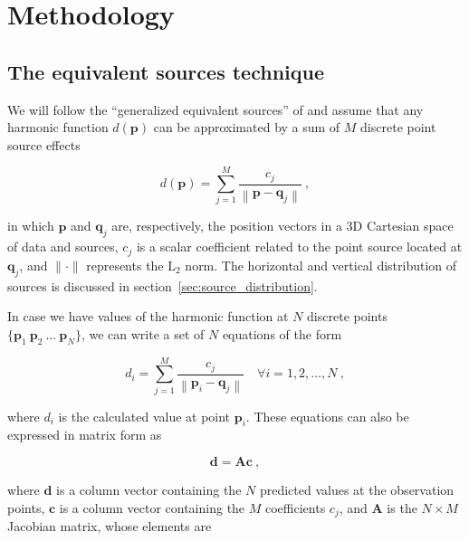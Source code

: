 
\section{Methodology}

\subsection{The equivalent sources technique}

We will follow the ``generalized equivalent sources'' of \citet{cordell1992}
and assume that any harmonic function $d(\mathbf{p})$ can be approximated by a
sum of $M$ discrete point source effects

\begin{equation}
    d(\mathbf{p})
    =
    \sum\limits_{j=1}^{M} \frac{c_j}{\left\lVert \mathbf{p} - \mathbf{q}_j
    \right\rVert} \ ,
    \label{eq:eql-forward}
\end{equation}

\noindent in which
$\mathbf{p}$ and $\mathbf{q}_j$ are, respectively, the position vectors in a 3D
Cartesian space of data and sources,
$c_j$ is a scalar coefficient related to the point source located at
$\mathbf{q}_j$,
and $\lVert \cdot \rVert$ represents the $\text{L}_2$ norm.
The horizontal and vertical distribution of sources is discussed in
section~\ref{sec:source_distribution}.

In case we have values of the harmonic function at $N$ discrete points
$\{\mathbf{p}_1\ \mathbf{p}_2\ \ldots\ \mathbf{p}_N\}$,
we can write a set of $N$ equations of the form

\begin{equation}
    d_i
    =
    \sum\limits_{j=1}^{M} \frac{c_j}{\left\lVert \mathbf{p}_i - \mathbf{q}_j
    \right\rVert}
    \quad \forall i=1,2,\ldots,N
    \ ,
    \label{eq:forward-sum}
\end{equation}

\noindent where $d_i$ is the calculated value at point $\mathbf{p}_i$.
These equations can also be expressed in matrix form as

\begin{equation}
    \mathbf{d} = \mathbf{A} \mathbf{c} \ ,
    \label{eq:linear-problem}
\end{equation}

\noindent where $\mathbf{d}$ is a column vector containing the $N$ predicted
values at the observation points,
$\mathbf{c}$ is a column vector containing the $M$ coefficients $c_j$,
and $\mathbf{A}$ is the $N \times M$ Jacobian matrix,
whose elements are

